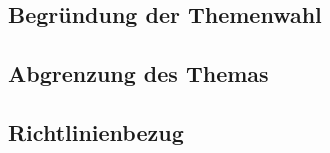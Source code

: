 \subsection{Begründung der Themenwahl}
\lipsum[1]
\subsection{Abgrenzung des Themas}
\subsection{Richtlinienbezug}
